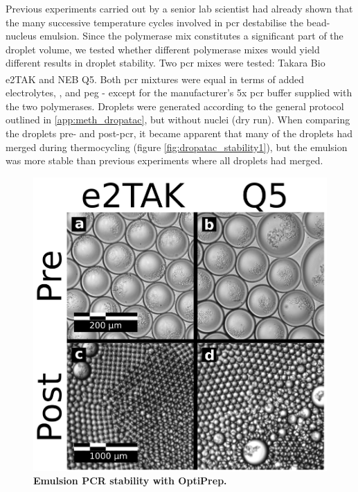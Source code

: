Previous experiments carried out by a senior lab scientist had already shown that the many successive temperature cycles involved in \acrshort{pcr} destabilise the bead-nucleus emulsion. Since the polymerase mix constitutes a significant part of the droplet volume, we tested whether different polymerase mixes would yield different results in droplet stability. Two \acrshort{pcr} mixes were tested: Takara Bio e2TAK and NEB Q5\textsuperscript{\textregistered}. Both \acrshort{pcr} mixtures were equal in terms of added electrolytes, , and \acrshort{peg} - except for the manufacturer's 5x \acrshort{pcr} buffer supplied with the two polymerases. Droplets were generated according to the general protocol outlined in \ref{app:meth_dropatac}, but without nuclei (dry run). When comparing the droplets pre- and post-\acrshort{pcr}, it became apparent that many of the droplets had merged during thermocycling (figure \ref{fig:dropatac_stability1}), but the emulsion was more stable than previous experiments where all droplets had merged.\pms


\begin{figure}
\centering
\includegraphics[width=\textwidth/3]{./ims/dropatac_stability2.png}
\caption[Emulsion PCR stability with OptiPrep]{\textbf{Emulsion PCR stability with OptiPrep.}}
\label{fig:dropatac_stability2}
\vspace{-20pt}
\end{figure}

